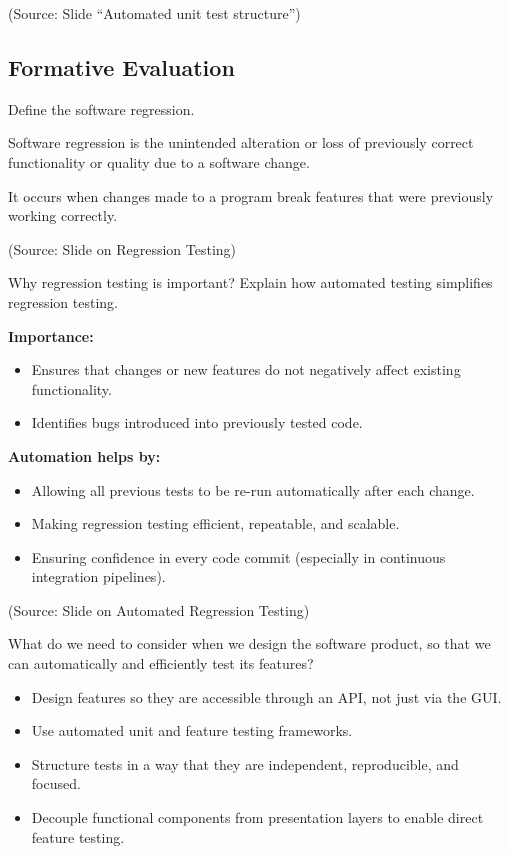 \documentclass[12pt]{article}
\begin{document}
(Source: Slide ``Automated unit test structure'')

\subsection{Formative Evaluation}

\begin{questionbox}
Define the software regression.
\end{questionbox}

Software regression is the unintended alteration or loss of previously correct functionality or quality due to a software change.

It occurs when changes made to a program break features that were previously working correctly.

(Source: Slide on Regression Testing)

\begin{questionbox}
Why regression testing is important? Explain how automated testing simplifies regression testing.
\end{questionbox}

\textbf{Importance:}
\begin{itemize}
    \item Ensures that changes or new features do not negatively affect existing functionality.
    \item Identifies bugs introduced into previously tested code.
\end{itemize}

\textbf{Automation helps by:}
\begin{itemize}
    \item Allowing all previous tests to be re-run automatically after each change.
    \item Making regression testing efficient, repeatable, and scalable.
    \item Ensuring confidence in every code commit (especially in continuous integration pipelines).
\end{itemize}

(Source: Slide on Automated Regression Testing)

\begin{questionbox}
What do we need to consider when we design the software product, so that we can automatically and efficiently test its features?
\end{questionbox}

\begin{itemize}
    \item Design features so they are accessible through an API, not just via the GUI.
    \item Use automated unit and feature testing frameworks.
    \item Structure tests in a way that they are independent, reproducible, and focused.
    \item Decouple functional components from presentation layers to enable direct feature testing.
\end{itemize}
\end{document}
